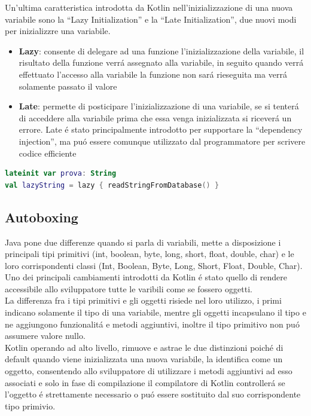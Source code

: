Un'ultima caratteristica introdotta da Kotlin nell'inizializzazione di una nuova variabile sono la ``Lazy  Initialization'' e la ``Late Initialization'', due nuovi modi per inizializzre una variabile.
\begin{itemize}                         %
\item \textbf{Lazy}: consente di delegare ad una funzione l'inizializzazione della variabile, il risultato della funzione verr\'a assegnato alla variabile, in seguito quando verr\'a effettuato l'accesso alla variabile la funzione non sar\'a rieseguita ma verr\'a solamente passato il valore
\item \textbf{Late}: permette di posticipare l'inizializzazione di una variabile, se si tenter\'a di acceddere alla variabile prima che essa venga inizializzata si ricever\'a un errore. Late \'e  stato principalmente introdotto per supportare la ``dependency injection'', ma pu\'o essere comunque utilizzato dal programmatore per scrivere codice efficiente
\end{itemize}

\begin{lstlisting}[language=Kotlin,caption={Esempio Late e Lazy Initialization in Kotlin}]
lateinit var prova: String
val lazyString = lazy { readStringFromDatabase() }
\end{lstlisting}


\subsection{Autoboxing}
Java pone due differenze quando si parla di variabili, mette a disposizione i principali tipi primitivi (int, boolean, byte, long, short, float, double, char) e le loro corrispondenti classi (Int, Boolean, Byte, Long, Short, Float, Double, Char).\\
Uno dei principali cambiamenti introdotti da Kotlin \'e stato quello di rendere accessibile allo sviluppatore tutte le varibili come se fossero oggetti.\\
La differenza fra i tipi primitivi e gli oggetti risiede nel loro utilizzo, i primi indicano solamente il tipo di una variabile, mentre gli oggetti incapsulano il tipo e ne aggiungono funzionalit\'a e metodi aggiuntivi, inoltre il tipo primitivo non pu\'o assumere valore nullo. \\
Kotlin operando ad alto livello, rimuove e astrae le due distinzioni poich\'e di default quando viene inizializzata una nuova variabile, la identifica come un oggetto, consentendo allo sviluppatore di utilizzare i metodi aggiuntivi ad esso associati e solo in fase di compilazione il compilatore di Kotlin controller\'a se l'oggetto \'e strettamente necessario o pu\'o essere sostituito dal suo corrispondente tipo primivio.


